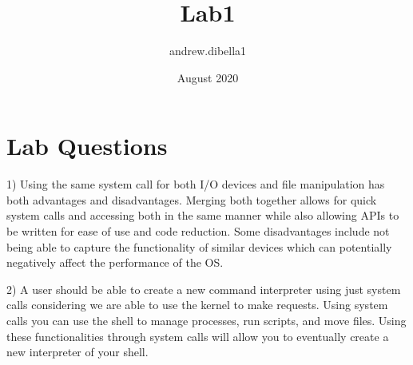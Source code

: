 \documentclass{article}
\title{Lab1}
\author{andrew.dibella1 }
\date{August 2020}
\begin{document}
\maketitle

\section{Lab Questions}


1) Using the same system call for both I/O devices and file manipulation has both advantages and disadvantages. Merging both together allows for quick system calls and accessing both in the same manner while also allowing APIs to be written for ease of use and code reduction. Some disadvantages include not being able to capture the functionality of similar devices which can potentially negatively affect the performance of the OS. 
\newline


2) A user should be able to create a new command interpreter using just system calls considering we are able to use the kernel to make requests. Using system calls you can use the shell to manage processes, run scripts, and move files. Using these functionalities through system calls will allow you to eventually create a new interpreter of your shell.   
\end{document}
